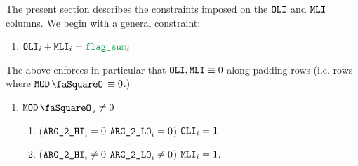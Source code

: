 The present section describes the constraints imposed on the $\texttt{OLI}$ and $\texttt{MLI}$ columns. We begin with a general constraint:
\begin{enumerate}
	\item $\oli_{i} + \mli_{i} = \locFlagSum_{i}$
\end{enumerate}
The above enforces in particular that $\texttt{OLI}, \texttt{MLI} \equiv 0$ along padding-rows (i.e. rows where $\modStamp\equiv 0$.) 
\begin{enumerate}[resume]
	\item \If $\modStamp_{i} \neq 0$ \Then
		\begin{enumerate}
			\item \If \big($\texttt{ARG}\texttt{\_2}\texttt{\_HI}_{i} = 0$ \et $\texttt{ARG}\texttt{\_2}\texttt{\_LO}_{i} = 0$\big) \Then $\texttt{OLI}_{i} = 1$
			\item \If \big($\texttt{ARG}\texttt{\_2}\texttt{\_HI}_{i} \neq 0$ \OR $\texttt{ARG}\texttt{\_2}\texttt{\_LO}_{i} \neq 0$\big) \Then $\texttt{MLI}_{i} = 1$.
		\end{enumerate}
\end{enumerate}
